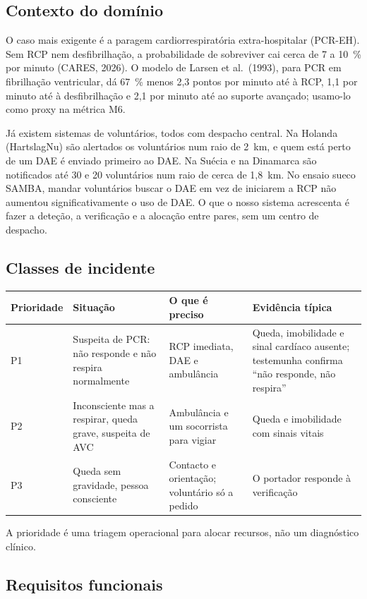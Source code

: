 \documentclass[10pt,a4paper]{article}
\begin{document}
\subsection{Contexto do domínio}\label{sec:contexto}

O caso mais exigente é a paragem cardiorrespiratória extra-hospitalar (PCR-EH). Sem RCP nem desfibrilhação, a probabilidade de sobreviver cai cerca de 7 a 10~\% por minuto (CARES, 2026). O modelo de Larsen et al.\ (1993), para PCR em fibrilhação ventricular, dá 67~\% menos 2,3 pontos por minuto até à RCP, 1,1 por minuto até à desfibrilhação e 2,1 por minuto até ao suporte avançado; usamo-lo como proxy na métrica M6.

Já existem sistemas de voluntários, todos com despacho central. Na Holanda (HartslagNu) são alertados os voluntários num raio de 2~km, e quem está perto de um DAE é enviado primeiro ao DAE. Na Suécia e na Dinamarca são notificados até 30 e 20 voluntários num raio de cerca de 1,8~km. No ensaio sueco SAMBA, mandar voluntários buscar o DAE em vez de iniciarem a RCP não aumentou significativamente o uso de DAE. O que o nosso sistema acrescenta é fazer a deteção, a verificação e a alocação entre pares, sem um centro de despacho.

\subsection{Classes de incidente}\label{sec:classes}

\noindent\begin{tabularx}{\linewidth}{@{}lLLL@{}}
\toprule
Prioridade & Situação & O que é preciso & Evidência típica \\
\midrule
P1 & Suspeita de PCR: não responde e não respira normalmente & RCP imediata, DAE e ambulância & Queda, imobilidade e sinal cardíaco ausente; testemunha confirma ``não responde, não respira'' \\
P2 & Inconsciente mas a respirar, queda grave, suspeita de AVC & Ambulância e um socorrista para vigiar & Queda e imobilidade com sinais vitais \\
P3 & Queda sem gravidade, pessoa consciente & Contacto e orientação; voluntário só a pedido & O portador responde à verificação \\
\bottomrule
\end{tabularx}

A prioridade é uma triagem operacional para alocar recursos, não um diagnóstico clínico.

\subsection{Requisitos funcionais}\label{sec:rf}
\end{document}
